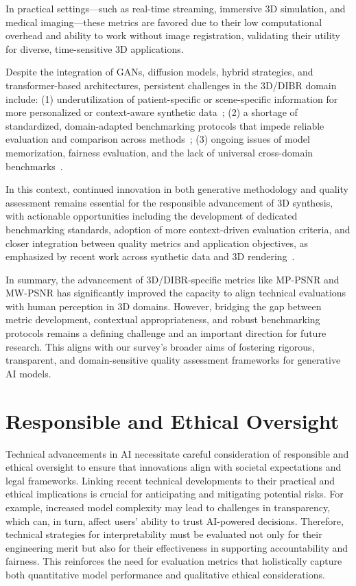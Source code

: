 \documentclass[sigconf]{acmart}
\begin{document}
In practical settings—such as real-time streaming, immersive 3D simulation, and medical imaging—these metrics are favored due to their low computational overhead and ability to work without image registration, validating their utility for diverse, time-sensitive 3D applications.

Despite the integration of GANs, diffusion models, hybrid strategies, and transformer-based architectures, persistent challenges in the 3D/DIBR domain include: (1) underutilization of patient-specific or scene-specific information for more personalized or context-aware synthetic data~\cite{ref89}; (2) a shortage of standardized, domain-adapted benchmarking protocols that impede reliable evaluation and comparison across methods~\cite{ref89,ref87}; (3) ongoing issues of model memorization, fairness evaluation, and the lack of universal cross-domain benchmarks~\cite{ref87,ref88}.

In this context, continued innovation in both generative methodology and quality assessment remains essential for the responsible advancement of 3D synthesis, with actionable opportunities including the development of dedicated benchmarking standards, adoption of more context-driven evaluation criteria, and closer integration between quality metrics and application objectives, as emphasized by recent work across synthetic data and 3D rendering~\cite{ref87}\cite{ref88}\cite{ref89}\cite{ref90}\cite{ref93}\cite{ref95}\cite{ref101}\cite{ref102}.

In summary, the advancement of 3D/DIBR-specific metrics like MP-PSNR and MW-PSNR has significantly improved the capacity to align technical evaluations with human perception in 3D domains. However, bridging the gap between metric development, contextual appropriateness, and robust benchmarking protocols remains a defining challenge and an important direction for future research. This aligns with our survey's broader aims of fostering rigorous, transparent, and domain-sensitive quality assessment frameworks for generative AI models.

\section{Responsible and Ethical Oversight}

Technical advancements in AI necessitate careful consideration of responsible and ethical oversight to ensure that innovations align with societal expectations and legal frameworks. Linking recent technical developments to their practical and ethical implications is crucial for anticipating and mitigating potential risks. For example, increased model complexity may lead to challenges in transparency, which can, in turn, affect users' ability to trust AI-powered decisions. Therefore, technical strategies for interpretability must be evaluated not only for their engineering merit but also for their effectiveness in supporting accountability and fairness. This reinforces the need for evaluation metrics that holistically capture both quantitative model performance and qualitative ethical considerations.
\end{document}

